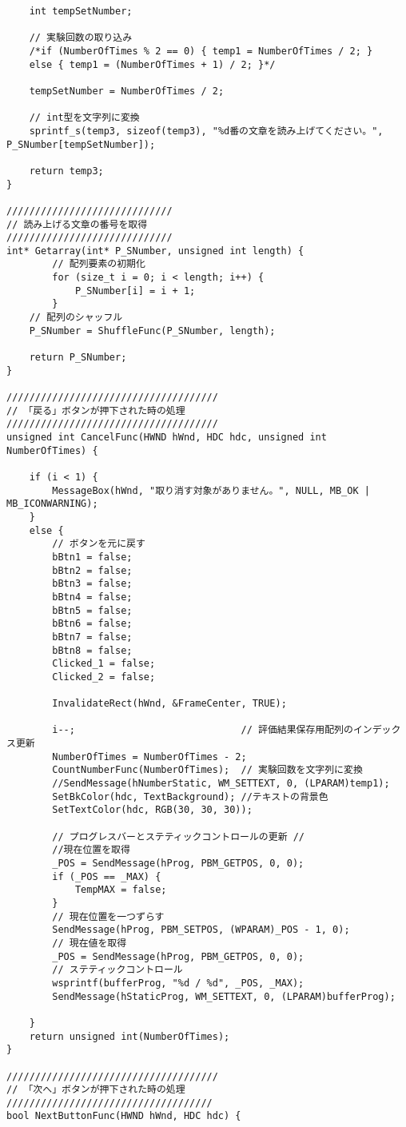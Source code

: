 \begin{verbatim}
	int tempSetNumber;
	
	// 実験回数の取り込み
	/*if (NumberOfTimes % 2 == 0) { temp1 = NumberOfTimes / 2; }
	else { temp1 = (NumberOfTimes + 1) / 2; }*/

	tempSetNumber = NumberOfTimes / 2;

	// int型を文字列に変換
	sprintf_s(temp3, sizeof(temp3), "%d番の文章を読み上げてください。", P_SNumber[tempSetNumber]);

	return temp3;
}

/////////////////////////////
// 読み上げる文章の番号を取得
/////////////////////////////
int* Getarray(int* P_SNumber, unsigned int length) {
		// 配列要素の初期化
		for (size_t i = 0; i < length; i++) {
			P_SNumber[i] = i + 1; 
		}
	// 配列のシャッフル
	P_SNumber = ShuffleFunc(P_SNumber, length);

	return P_SNumber;
}

/////////////////////////////////////
// 「戻る」ボタンが押下された時の処理
/////////////////////////////////////
unsigned int CancelFunc(HWND hWnd, HDC hdc, unsigned int NumberOfTimes) {

	if (i < 1) {
		MessageBox(hWnd, "取り消す対象がありません。", NULL, MB_OK | MB_ICONWARNING);
	}
	else {
		// ボタンを元に戻す
		bBtn1 = false;
		bBtn2 = false;
		bBtn3 = false;
		bBtn4 = false;
		bBtn5 = false;
		bBtn6 = false;
		bBtn7 = false;
		bBtn8 = false;
		Clicked_1 = false;
		Clicked_2 = false;

		InvalidateRect(hWnd, &FrameCenter, TRUE);

		i--;                             // 評価結果保存用配列のインデックス更新
		NumberOfTimes = NumberOfTimes - 2;
		CountNumberFunc(NumberOfTimes);  // 実験回数を文字列に変換
		//SendMessage(hNumberStatic, WM_SETTEXT, 0, (LPARAM)temp1);
		SetBkColor(hdc, TextBackground); //テキストの背景色
		SetTextColor(hdc, RGB(30, 30, 30));

		// プログレスバーとステティックコントロールの更新 //
		//現在位置を取得
		_POS = SendMessage(hProg, PBM_GETPOS, 0, 0); 
		if (_POS == _MAX) {
			TempMAX = false;
		}
		// 現在位置を一つずらす
		SendMessage(hProg, PBM_SETPOS, (WPARAM)_POS - 1, 0);
		// 現在値を取得
		_POS = SendMessage(hProg, PBM_GETPOS, 0, 0);
		// ステティックコントロール
		wsprintf(bufferProg, "%d / %d", _POS, _MAX);
		SendMessage(hStaticProg, WM_SETTEXT, 0, (LPARAM)bufferProg);

	}
	return unsigned int(NumberOfTimes);
}

/////////////////////////////////////
// 「次へ」ボタンが押下された時の処理
////////////////////////////////////
bool NextButtonFunc(HWND hWnd, HDC hdc) {


\end{verbatim}
